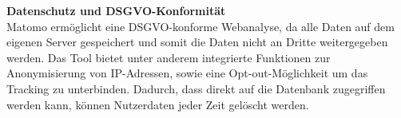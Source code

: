 \textbf{Datenschutz und DSGVO-Konformität} \\
Matomo ermöglicht eine DSGVO-konforme Webanalyse, da alle Daten auf dem eigenen Server gespeichert und somit die Daten nicht an Dritte weitergegeben werden. Das Tool bietet unter anderem integrierte Funktionen zur Anonymisierung von IP-Adressen, sowie eine Opt-out-Möglichkeit um das Tracking zu unterbinden. Dadurch, dass direkt auf die Datenbank zugegriffen werden kann, können Nutzerdaten jeder Zeit gelöscht werden. \parencite{MatomoPersonalData}